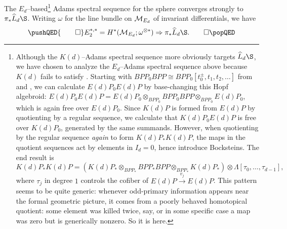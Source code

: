 \begin{theorem}
The $E_d$--based\footnote{Although the $K(d)$--Adams spectral sequence more obviously targets $\widehat L_d \S$, we have chosen to analyze the $E_d$--Adams spectral sequence above because $K(d)$ fails to satisfy {\CH}.  Starting with $BPP_0 BPP \cong BPP_0[t_0^{\pm}, t_1, t_2, \ldots]$ from  and , we can calculate $E(d)P_0 E(d)P$ by base-changing this Hopf algebroid: $E(d)P_0 E(d)P = E(d)P_0 \otimes_{BPP_0} BPP_0 BPP \otimes_{BPP_0} E(d)P_0$, which is again free over $E(d)P_0$.  Since $K(d)P$ is formed from $E(d)P$ by quotienting by a regular sequence, we calculate that $K(d)P_0 E(d)P$ is free over $K(d)P_0$, generated by the same summands.  However, when quotienting by the regular sequence \emph{again} to form $K(d)P_* K(d)P$, the maps in the quotient sequences act by elements in $I_d = 0$, hence introduce Bocksteins.  The end result is \[K(d)P_* K(d)P = \left(K(d)P_* \otimes_{BPP_*} BPP_* BPP \otimes_{BPP_*} K(d)P_*\right) \otimes \Lambda[\tau_0, \ldots, \tau_{d-1}],\] where $\tau_j$ in degree $1$ controls the cofiber of $E(d)P \xrightarrow{v_j} E(d)P$.  This pattern seems to be quite generic: whenever odd-primary information appears near the formal geometric picture, it comes from a poorly behaved homotopical quotient: some element was killed twice, say, or in some specific case a map was zero but is generically nonzero.  So it is here.}
Adams spectral sequence for the sphere converges strongly to $\pi_* \widehat L_d \S$.  Writing $\omega$ for the line bundle on $\mathcal{M}_{E_d}$ of invariant differentials, we have
\[\pushQED{\qed}
E_2^{*, *} = H^*(\context{E_d}; \omega^{\otimes *}) \Rightarrow \pi_* \widehat L_d \S. \qedhere
\popQED\]
\end{theorem}

